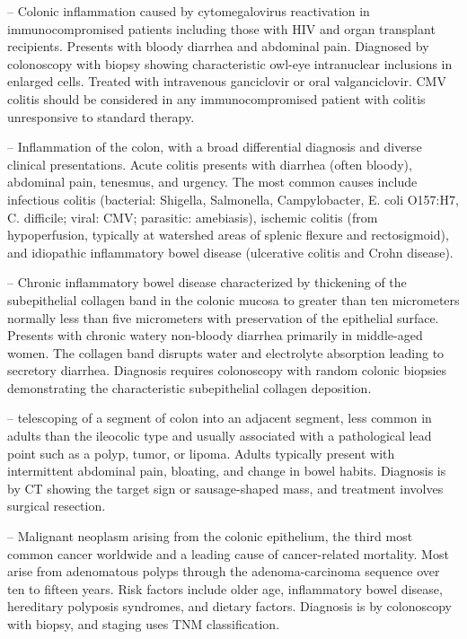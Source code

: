 -- Colonic inflammation caused by cytomegalovirus reactivation in immunocompromised patients including those with HIV and organ transplant recipients. Presents with bloody diarrhea and abdominal pain. Diagnosed by colonoscopy with biopsy showing characteristic owl-eye intranuclear inclusions in enlarged cells. Treated with intravenous ganciclovir or oral valganciclovir. CMV colitis should be considered in any immunocompromised patient with colitis unresponsive to standard therapy.

-- Inflammation of the colon, with a broad differential diagnosis and diverse clinical presentations. Acute colitis presents with diarrhea (often bloody), abdominal pain, tenesmus, and urgency. The most common causes include infectious colitis (bacterial: Shigella, Salmonella, Campylobacter, E. coli O157:H7, C. difficile; viral: CMV; parasitic: amebiasis), ischemic colitis (from hypoperfusion, typically at watershed areas of splenic flexure and rectosigmoid), and idiopathic inflammatory bowel disease (ulcerative colitis and Crohn disease).

-- Chronic inflammatory bowel disease characterized by thickening of the subepithelial collagen band in the colonic mucosa to greater than ten micrometers normally less than five micrometers with preservation of the epithelial surface. Presents with chronic watery non-bloody diarrhea primarily in middle-aged women. The collagen band disrupts water and electrolyte absorption leading to secretory diarrhea. Diagnosis requires colonoscopy with random colonic biopsies demonstrating the characteristic subepithelial collagen deposition.

-- telescoping of a segment of colon into an adjacent segment, less common in adults than the ileocolic type and usually associated with a pathological lead point such as a polyp, tumor, or lipoma. Adults typically present with intermittent abdominal pain, bloating, and change in bowel habits. Diagnosis is by CT showing the target sign or sausage-shaped mass, and treatment involves surgical resection.

-- Malignant neoplasm arising from the colonic epithelium, the third most common cancer worldwide and a leading cause of cancer-related mortality. Most arise from adenomatous polyps through the adenoma-carcinoma sequence over ten to fifteen years. Risk factors include older age, inflammatory bowel disease, hereditary polyposis syndromes, and dietary factors. Diagnosis is by colonoscopy with biopsy, and staging uses TNM classification.

